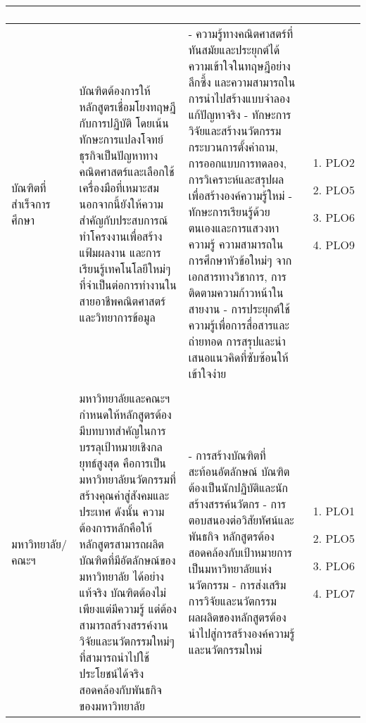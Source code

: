 \begin{longtable}{| >{\raggedright}p{} | >{\raggedright}p{} | >{\raggedright}p{} | >{\centering\arraybackslash}p{} |}
\begin{enumerate}[label={}]
\end{enumerate}
 \\    
\hline
บัณฑิตที่สำเร็จการศึกษา & 
บัณฑิตต้องการให้หลักสูตรเชื่อมโยงทฤษฎีกับการปฏิบัติ โดยเน้นทักษะการแปลงโจทย์ธุรกิจเป็นปัญหาทางคณิตศาสตร์และเลือกใช้เครื่องมือที่เหมาะสม นอกจากนี้ยังให้ความสำคัญกับประสบการณ์ทำโครงงานเพื่อสร้างแฟ้มผลงาน และการเรียนรู้เทคโนโลยีใหม่ๆ ที่จำเป็นต่อการทำงานในสายอาชีพคณิตศาสตร์และวิทยาการข้อมูล 
&
- ความรู้ทางคณิตศาสตร์ที่ทันสมัยและประยุกต์ได้ ความเข้าใจในทฤษฎีอย่างลึกซึ้ง และความสามารถในการนำไปสร้างแบบจำลองแก้ปัญหาจริง \newline
- ทักษะการวิจัยและสร้างนวัตกรรม กระบวนการตั้งคำถาม, การออกแบบการทดลอง, การวิเคราะห์และสรุปผลเพื่อสร้างองค์ความรู้ใหม่ \newline
- ทักษะการเรียนรู้ด้วยตนเองและการแสวงหาความรู้ ความสามารถในการศึกษาหัวข้อใหม่ๆ จากเอกสารทางวิชาการ, การติดตามความก้าวหน้าในสายงาน \newline
- การประยุกต์ใช้ความรู้เพื่อการสื่อสารและถ่ายทอด การสรุปและนำเสนอแนวคิดที่ซับซ้อนให้เข้าใจง่าย &
\begin{enumerate}[label={}]
	\item PLO2
	\item PLO5
	\item PLO6
	\item PLO9
\end{enumerate}
 \\
    \hline
    \multicolumn{4}{|l|}{\textbf{ผู้มีส่วนได้ส่วนเสียภายใน (Internal Stakeholders)}} \\
    \hline
มหาวิทยาลัย/คณะฯ & 
มหาวิทยาลัยและคณะฯ กำหนดให้หลักสูตรต้องมีบทบาทสำคัญในการบรรลุเป้าหมายเชิงกลยุทธ์สูงสุด คือการเป็นมหาวิทยาลัยนวัตกรรมที่สร้างคุณค่าสู่สังคมและประเทศ  ดังนั้น ความต้องการหลักคือให้หลักสูตรสามารถผลิตบัณฑิตที่มีอัตลักษณ์ของมหาวิทยาลัย  ได้อย่างแท้จริง บัณฑิตต้องไม่เพียงแต่มีความรู้ แต่ต้องสามารถสร้างสรรค์งานวิจัยและนวัตกรรมใหม่ๆ ที่สามารถนำไปใช้ประโยชน์ได้จริง สอดคล้องกับพันธกิจของมหาวิทยาลัย &
- การสร้างบัณฑิตที่สะท้อนอัตลักษณ์ บัณฑิตต้องเป็นนักปฏิบัติและนักสร้างสรรค์นวัตกร  \newline
- การตอบสนองต่อวิสัยทัศน์และพันธกิจ หลักสูตรต้องสอดคล้องกับเป้าหมายการเป็นมหาวิทยาลัยแห่งนวัตกรรม  \newline
- การส่งเสริมการวิจัยและนวัตกรรม ผลผลิตของหลักสูตรต้องนำไปสู่การสร้างองค์ความรู้และนวัตกรรมใหม่  &
\begin{enumerate}[label={}]
	\item PLO1
	\item PLO5
	\item PLO6
	\item PLO7

\end{enumerate}
\end{longtable}
